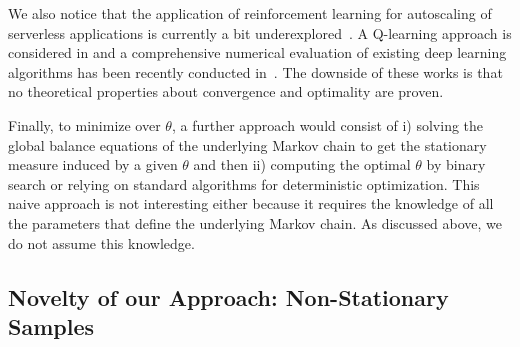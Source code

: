 {
We also notice that the application of reinforcement learning for autoscaling of serverless applications is currently a bit underexplored~\cite{Benedetti22,Buyya24}.
A Q-learning approach is considered in \cite{Buyya21} and a comprehensive numerical evaluation of existing deep learning algorithms has been recently conducted in~\cite{Buyya24}.
The downside of these works is that no theoretical properties about convergence and optimality are proven.}


Finally, to minimize over $\theta$, a further approach would consist of i) solving the global balance equations of the underlying Markov chain to get the stationary measure induced by a given $\theta$ and then ii) computing the optimal $\theta$ by binary search or relying on standard algorithms for deterministic optimization.
This naive  approach is not interesting either because it requires the knowledge of all the parameters that define the underlying Markov chain. As discussed above, we do not assume this knowledge.



\subsection{Novelty of our Approach: Non-Stationary Samples}
\label{ssec:nonstationary}

